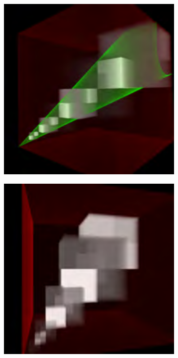 \begin{figure}\label{f:vct-cone-footprints}
	\begin{subfigure}[b]{0.24\textwidth}
		\includegraphics[width=1.0\textwidth]{graphics/vct/vct-8-1}
		\caption{}
	\end{subfigure}
	\begin{subfigure}[b]{0.24\textwidth}
		\includegraphics[width=1.0\textwidth]{graphics/vct/vct-8-2}

\end{subfigure}
\end{figure}

